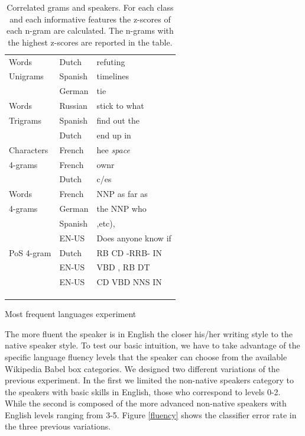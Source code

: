 \documentclass[10pt,a5paper,twoside]{article}
\begin{document}
\begin{table}[t]
\begin{subtable}[]{0.5\textwidth}
\begin{tabular}{l|ll}
   Words &Dutch& refuting\\
      Unigrams&Spanish&timelines\\
       &German& tie\\\hline

   Words&Russian& stick to what\\
   Trigrams&Spanish& find out the\\
   &Dutch& end up in\\\hline

   Characters &French& hee \emph{space}\\
   4-grams      &French&ownr\\
&Dutch&c/es\\
   \hline
   Words &French& NNP as far as\\
   4-grams &German& the NNP who\\
   &Spanish& ,etc),\\
   &EN-US& Does anyone know if\\\hline
   PoS 4-gram &Dutch& RB CD -RRB- IN \\
   &EN-US& VBD , RB DT\\
   &EN-US& CD VBD NNS IN\\
   && \\
   && \\
   && \\
   \end{tabular}
   \caption{Most frequent languages experiment}
   \label{table:frequent}
   \end{subtable}
\label{table:analysis}
\caption{Correlated grams and speakers. For each class and each informative
features the z-scores of each n-gram are calculated. The n-grams with the
highest z-scores are reported in the table.}
\end{table}

The more fluent the speaker is in English the closer his/her writing
style to the native speaker style. To test our basic intuition,
we have to take advantage of the specific language fluency levels that the speaker can choose
from the available Wikipedia Babel box categories. We designed two different
variations of the previous experiment. In the first we limited
the non-native speakers category to the speakers with basic skills in English,
those who correspond to levels 0-2.
While the second is composed of the more advanced non-native speakers with
English levels ranging from 3-5.
Figure \ref{fluency} shows the classifier error rate in the three previous
variations.
\end{document}

